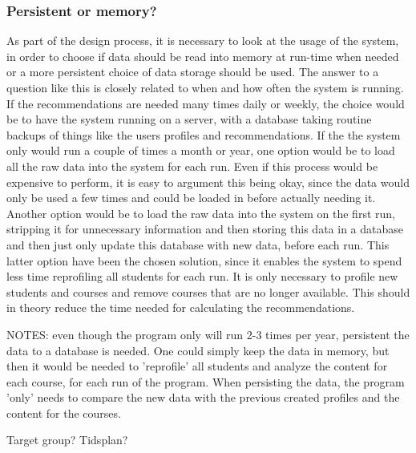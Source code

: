 \subsubsection{Persistent or memory?}
\label{subsec:persistent}
As part of the design process, it is necessary to look at the usage of the system, in order to choose if data should be read into memory at run-time when needed or a more persistent choice of data storage should be used. The answer to a question like this is closely related to when and how often the system is running. If the recommendations are needed many times daily or weekly, the choice would be to have the system running on a server, with a database taking routine backups of things like the users profiles and recommendations. If the the system only would run a couple of times a month or year, one option would be to load all the raw data into the system for each run. Even if this process would be expensive to perform, it is easy to argument this being okay, since the data would only be used a few times and could be loaded in before actually needing it. Another option would be to load the raw data into the system on the first run, stripping it for unnecessary information and then storing this data in a database and then just only update this database with new data, before each run. This latter option have been the chosen solution, since it enables the system to spend less time reprofiling all students for each run. It is only necessary to profile new students and courses and remove courses that are no longer available. This should in theory reduce the time needed for calculating the recommendations.

NOTES:
even though the program only will run 2-3 times per year, persistent the data to a database is needed. One could simply keep the data in memory, but then it would be needed to 'reprofile' all students and analyze the content for each course, for each run of the program. When persisting the data, the program 'only' needs to compare the new data with the previous created profiles and the content for the courses.


Target group?
Tidsplan?

